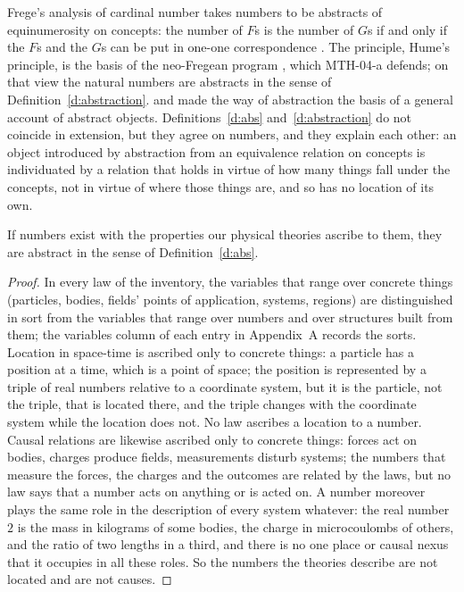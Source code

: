 \documentclass{situationist-preprint}
\begin{document}
Frege's analysis of cardinal number takes numbers to be abstracts of equinumerosity on concepts: the number of $F$s is the number of $G$s if and only if the $F$s and the $G$s can be put in one-one correspondence \citep[\S\S62--69]{Frege1884}. The principle, Hume's principle, is the basis of the neo-Fregean program \citep{HaleWright2001}, which MTH-04-a defends; on that view the natural numbers are abstracts in the sense of Definition~\ref{d:abstraction}. \citet{Dummett1973} and \citet{Hale1987} made the way of abstraction the basis of a general account of abstract objects. Definitions~\ref{d:abs} and~\ref{d:abstraction} do not coincide in extension, but they agree on numbers, and they explain each other: an object introduced by abstraction from an equivalence relation on concepts is individuated by a relation that holds in virtue of how many things fall under the concepts, not in virtue of where those things are, and so has no location of its own.

\begin{proposition}\label{p:abs-phys}
If numbers exist with the properties our physical theories ascribe to them, they are abstract in the sense of Definition~\ref{d:abs}.
\end{proposition}

\begin{proof}
In every law of the inventory, the variables that range over concrete things (particles, bodies, fields' points of application, systems, regions) are distinguished in sort from the variables that range over numbers and over structures built from them; the variables column of each entry in Appendix~A records the sorts. Location in space-time is ascribed only to concrete things: a particle has a position at a time, which is a point of space; the position is represented by a triple of real numbers relative to a coordinate system, but it is the particle, not the triple, that is located there, and the triple changes with the coordinate system while the location does not. No law ascribes a location to a number. Causal relations are likewise ascribed only to concrete things: forces act on bodies, charges produce fields, measurements disturb systems; the numbers that measure the forces, the charges and the outcomes are related by the laws, but no law says that a number acts on anything or is acted on. A number moreover plays the same role in the description of every system whatever: the real number $2$ is the mass in kilograms of some bodies, the charge in microcoulombs of others, and the ratio of two lengths in a third, and there is no one place or causal nexus that it occupies in all these roles. So the numbers the theories describe are not located and are not causes.
\end{proof}
\end{document}
